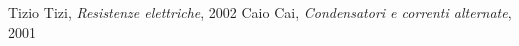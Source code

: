 \newpage
\begin{thebibliography}{ZZZZZ}
   Tizio Tizi, \textit{Resistenze elettriche}, 2002
   Caio Cai, \textit{Condensatori e correnti alternate}, 2001
\end{thebibliography}
